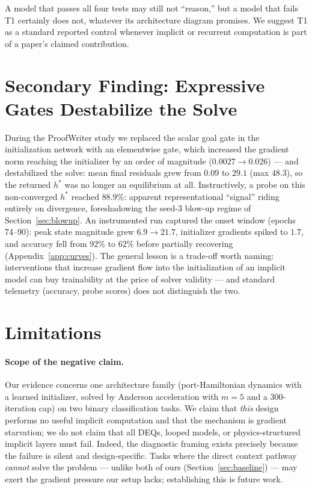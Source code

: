 \documentclass[11pt]{article}
\newcommand{\hstar}{h^{*}}
\begin{document}
A model that passes all four tests may still not ``reason,'' but a
model that fails T1 certainly does not, whatever its architecture
diagram promises. We suggest T1 as a standard reported control
whenever implicit or recurrent computation is part of a paper's
claimed contribution.

\section{Secondary Finding: Expressive Gates Destabilize the Solve}\label{sec:gate}
During the ProofWriter study we replaced the scalar goal gate in the
initialization network with an elementwise gate, which increased the
gradient norm reaching the initializer by an order of magnitude
($0.0027\to0.026$) --- and destabilized the solve: mean final
residuals grew from $0.09$ to $29.1$ (max $48.3$), so the returned
$\hstar$ was no longer an equilibrium at all. Instructively, a probe
on this non-converged $\hstar$ reached $88.9\%$: apparent
representational ``signal'' riding entirely on divergence, foreshadowing
the seed-3 blow-up regime of Section~\ref{sec:blowup}. An instrumented
run captured the onset window (epochs 74--90): peak state magnitude
grew $6.9\to21.7$, initializer gradients spiked to $1.7$, and
accuracy fell from $92\%$ to $62\%$ before partially recovering
(Appendix~\ref{app:curves}). The general lesson is a trade-off worth
naming: interventions that increase gradient flow into the
initialization of an implicit model can buy trainability at the price
of solver validity --- and standard telemetry (accuracy, probe scores)
does not distinguish the two.

\section{Limitations}\label{sec:limitations}
\paragraph{Scope of the negative claim.} Our evidence concerns one
architecture family (port-Hamiltonian dynamics with a learned
initializer, solved by Anderson acceleration with $m{=}5$ and a
300-iteration cap) on two binary classification tasks. We claim that
\emph{this} design performs no useful implicit computation and that
the mechanism is gradient starvation; we do not claim that all DEQs,
looped models, or physics-structured implicit layers must fail.
Indeed, the diagnostic framing exists precisely because the failure is
silent and design-specific. Tasks where the direct context pathway
\emph{cannot} solve the problem --- unlike both of ours
(Section~\ref{sec:baseline}) --- may exert the gradient pressure our
setup lacks; establishing this is future work.
\end{document}
